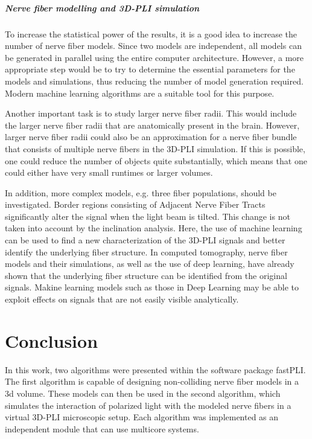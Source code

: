\paragraph{Nerve fiber modelling and \ac{3D-PLI} simulation}
% 
To increase the statistical power of the results, it is a good idea to increase the number of nerve fiber models.
Since two models are independent, all models can be generated in parallel using the entire computer architecture.
However, a more appropriate step would be to try to determine the essential parameters for the models and simulations, thus reducing the number of model generation required.
Modern machine learning algorithms are a suitable tool for this purpose.
\par
% 
Another important task is to study larger nerve fiber radii.
This would include the larger nerve fiber radii that are anatomically present in the brain.
However, larger nerve fiber radii could also be an approximation for a nerve fiber bundle that consists of multiple nerve fibers in the \ac{3D-PLI} simulation.
If this is possible, one could reduce the number of objects quite substantially, which means that one could either have very small runtimes or larger volumes.
\par
% 
In addition, more complex models, e.g. three fiber populations, should be investigated.
Border regions consisting of Adjacent Nerve Fiber Tracts significantly alter the signal when the light beam is tilted.
This change is not taken into account by the inclination analysis.
Here, the use of machine learning can be used to find a new characterization of the \ac{3D-PLI} signals and better identify the underlying fiber structure.
In computed tomography, nerve fiber models and their simulations, as well as the use of deep learning, have already shown that the underlying fiber structure can be \cite{ginsburgerDis2019} identified from the original signals.
Makine learning models such as those in Deep Learning may be able to exploit effects on signals that are not easily visible analytically.
% 
% 
% 
% 
% 
\chapter{Conclusion}
\label{sec:conclusion}
% 
In this work, two algorithms were presented within the software package \ac{fastPLI}.
The first algorithm is capable of designing non-colliding nerve fiber models in a 3d volume.
These models can then be used in the second algorithm, which simulates the interaction of polarized light with the modeled nerve fibers in a virtual \ac{3D-PLI} microscopic setup.
Each algorithm was implemented as an independent \python{} module that can use multicore systems.
% 
% 
% 
